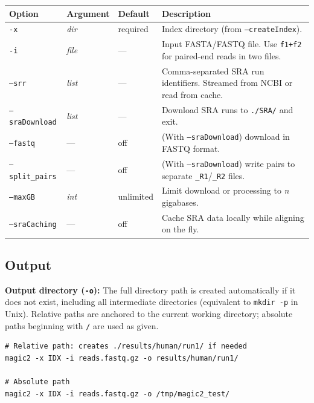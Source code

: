\documentclass[11pt]{article}
\newcommand{\code}[1]{\texttt{#1}}
\begin{document}
\begin{center}
\begin{longtable}{p{4cm} p{2.2cm} p{2cm} p{6cm}}
\toprule
\textbf{Option} & \textbf{Argument} & \textbf{Default} & \textbf{Description} \\
\midrule
\endhead
\code{-x}            & \textit{dir}    & required & Index directory (from \code{--createIndex}). \\
\code{-i}            & \textit{file}   & ---      & Input FASTA/FASTQ file.  Use \code{f1+f2}
                                                    for paired-end reads in two files. \\
\code{--srr}         & \textit{list}   & ---      & Comma-separated SRA run identifiers.
                                                    Streamed from NCBI or read from cache. \\
\code{--sraDownload} & \textit{list}   & ---      & Download SRA runs to \code{./SRA/} and exit. \\
\code{--fastq}       & ---             & off      & (With \code{--sraDownload}) download in
                                                    FASTQ format. \\
\code{--split\_pairs}& ---             & off      & (With \code{--sraDownload}) write pairs to
                                                    separate \code{\_R1}/\code{\_R2} files. \\
\code{--maxGB}       & \textit{int}    & unlimited& Limit download or processing to \textit{n} gigabases. \\
\code{--sraCaching}  & ---             & off      & Cache SRA data locally while aligning on the fly. \\
\bottomrule
\end{longtable}
\end{center}

\subsection{Output}

\textbf{Output directory (\code{-o}):}
The full directory path is created automatically if it does not exist,
including all intermediate directories
(equivalent to \code{mkdir -p} in Unix).
Relative paths are anchored to the current working directory;
absolute paths beginning with \code{/} are used as given.

\begin{lstlisting}
# Relative path: creates ./results/human/run1/ if needed
magic2 -x IDX -i reads.fastq.gz -o results/human/run1/

# Absolute path
magic2 -x IDX -i reads.fastq.gz -o /tmp/magic2_test/
\end{lstlisting}
\end{document}
